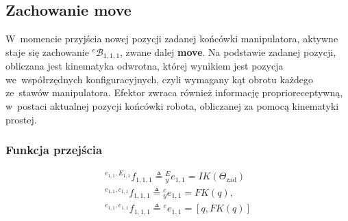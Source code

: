 
\subsection{Zachowanie move}
\label{subsec:ve-manip-move}

W~momencie przyjścia nowej pozycji zadanej końcówki manipulatora, aktywne staje się zachowanie ${}^{e}\mathcal{B}_{1,1,1}$, zwane dalej \textbf{move}. Na podstawie zadanej pozycji, obliczana jest kinematyka odwrotna, której wynikiem jest pozycja we~współrzędnych konfiguracyjnych, czyli wymagany kąt obrotu każdego ze~stawów manipulatora. Efektor zwraca również informację proprioreceptywną, w~postaci aktualnej pozycji końcówki robota, obliczanej za pomocą kinematyki prostej.

\subsubsection{Funkcja przejścia}
\begin{equation}
    \begin{gathered}
        {}^{e_{1,1}, E_{1,1}}f_{1,1,1} \triangleq {}^{E}_{y}e_{1,1} = IK(\Theta_{\mathrm{zad}})\\
        {}^{e_{1,1}, c_{1,1}}f_{1,1,1} \triangleq {}^{c}_{y}e_{1,1} = FK(q),\\
        {}^{e_{1,1}, e_{1,1}}f_{1,1,1} \triangleq {}^{e}e_{1,1} = [q, FK(q)]
    \end{gathered}
\end{equation}


